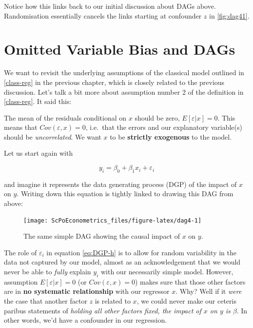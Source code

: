 \documentclass[]{book}
\newenvironment{warning}{\begin{tcolorbox}[colback=orange!5!white,colframe=orange]}{\end{tcolorbox}}
\begin{document}
Notice how this links back to our initial discussion about DAGs above. Randomisation essentially cancels the links starting at confounder \(z\) in \ref{fig:dag41}.

\hypertarget{omitted-variable-bias-and-dags}{%
\section{Omitted Variable Bias and DAGs}\label{omitted-variable-bias-and-dags}}

We want to revisit the underlying assumptions of the classical model outlined in \ref{class-reg} in the previous chapter, which is closely related to the previous discussion. Let's talk a bit more about assumption number 2 of the definition in \ref{class-reg}. It said this:

\begin{warning}
The mean of the residuals conditional on \(x\) should be zero,
\(E[\varepsilon|x] = 0\). This means that \(Cov(\varepsilon,x) = 0\),
i.e.~that the errors and our explanatory variable(s) should be
\emph{uncorrelated}. We want \(x\) to be \textbf{strictly exogenous} to
the model.
\end{warning}

Let us start again with

\begin{equation}
y_i = \beta_0 + \beta_1 x_i + \varepsilon_i \label{eq:DGP-h}
\end{equation}

and imagine it represents the data generating process (DGP) of the impact of \(x\) on \(y\). Writing down this equation is tightly linked to drawing this DAG from above:

\begin{figure}

{\centering \texttt{[image: ScPoEconometrics\_files/figure-latex/dag4-1]} 

}

\caption{The same simple DAG showing the causal impact of $x$ on $y$.}\label{fig:dag4}
\end{figure}

The role of \(\varepsilon_i\) in equation \eqref{eq:DGP-h} is to allow for random variability in the data not captured by our model, almost as an acknowledgement that we would never be able to \emph{fully} explain \(y_i\) with our necessarily simple model. However, assumption \(E[\varepsilon|x] = 0\) (or \(Cov(\varepsilon,x) = 0\)) makes sure that those other factors are in \textbf{no systematic relationship} with our regressor \(x\). Why? Well if it \emph{were} the case that another factor \(z\) is related to \(x\), we could never make our ceteris paribus statements of \emph{holding all other factors fixed, the impact of \(x\) on \(y\) is \(\beta\)}. In other words, we'd have a confounder in our regression.
\end{document}
